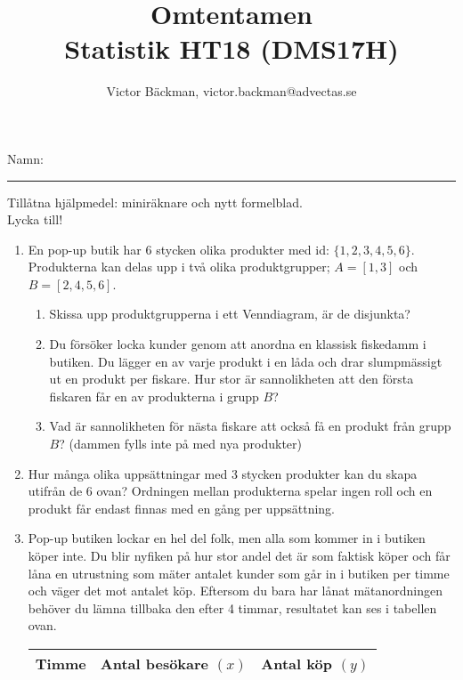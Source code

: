 \documentclass[a4paper,10pt]{article}
\title{Omtentamen\\ {Statistik HT18 (DMS17H)}}
\author{Victor Bäckman, victor.backman@advectas.se}
\begin{document}
\maketitle
\vspace{2cm}
Namn:
{\rule{13cm}{0.4pt}}
\vspace{5cm}
\begin{center}
  Tillåtna hjälpmedel: miniräknare och nytt formelblad.\\
    \vspace{3cm}
  {\huge Lycka till!}
\end{center}

\newpage
\begin{enumerate}
    \item{En pop-up butik har $6$ stycken olika produkter med id: $\{1, 2, 3, 4, 5, 6\}$. Produkterna kan delas upp i två olika produktgrupper; $A=[1, 3]$ och $B=[2, 4, 5, 6]$.}
    \begin{enumerate}
        \item{Skissa upp produktgrupperna i ett Venndiagram, är de disjunkta?}
        \vspace{8cm}
        \item{Du försöker locka kunder genom att anordna en klassisk fiskedamm i butiken. Du lägger en av varje produkt i en låda och drar slumpmässigt ut en produkt per fiskare. Hur stor är sannolikheten att den första fiskaren får en av produkterna i grupp $B$?}
        \newpage
        \item{Vad är sannolikheten för nästa fiskare att också få en produkt från grupp $B$? (dammen fylls inte på med nya produkter)}
    \end{enumerate}
    \newpage
    \item{Hur många olika uppsättningar  med $3$ stycken produkter kan du skapa utifrån de $6$ ovan? Ordningen mellan produkterna spelar ingen roll och en produkt får endast finnas med en gång per uppsättning.}
    \newpage
    \item{Pop-up butiken lockar en hel del folk, men alla som kommer in i butiken köper inte. Du blir nyfiken på hur stor andel det är som faktisk köper och får låna en utrustning som mäter antalet kunder som går in i butiken per timme och väger det mot antalet köp. Eftersom du bara har lånat mätanordningen behöver du lämna tillbaka den efter 4 timmar, resultatet kan ses i tabellen ovan.
    \begin{table}
        \centering
        \begin{tabular}[H]{c|c|c}
        \textbf{Timme} & \textbf{Antal besökare $(x)$}  & \textbf{Antal köp $(y)$}\\ \hline

\end{tabular}
\end{table}}
\end{enumerate}
\end{document}
